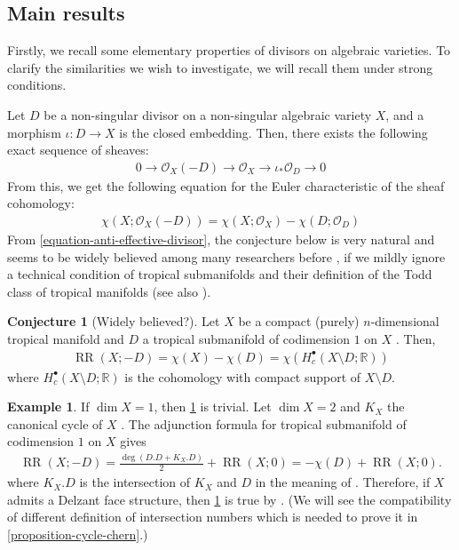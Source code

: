 \documentclass[a4paper,dvipdfmx,reqno,12pt]{amsart}
\theoremstyle{definition}
\newtheorem{example}[theorem]{Example}
\newtheorem{conjecture}[theorem]{Conjecture}
\newcommand{\opn}[1]{\operatorname{#1}}
\numberwithin{equation}{section}
\begin{document}
\subsection{Main results}

Firstly, we recall some elementary properties
of divisors on algebraic varieties. 
To clarify the similarities we wish to investigate,
we will recall them under strong conditions.

Let $D$ be a non-singular divisor on a non-singular
algebraic variety $X$, and a morphism  
$\iota\colon D\to X$ is the closed embedding.
Then, there exists the following exact sequence
of sheaves:
\begin{align}
     0\to \mathcal{O}_X(-D)\to 
\mathcal{O}_X\to \iota_*\mathcal{O}_D\to 0
\end{align}
From this, we get the following equation for the Euler
characteristic of the sheaf cohomology:
\begin{align}
\label{equation-anti-effective-divisor}
\chi(X;\mathcal{O}_X(-D))=\chi(X;\mathcal{O}_X)
-\chi(D;\mathcal{O}_D)
\end{align}
From \eqref{equation-anti-effective-divisor},
the conjecture below is very natural and 
seems to be widely
believed among many researchers
before \cite{demedrano2023chern}, if
we mildly ignore a technical condition of 
tropical submanifolds \cite[Definition 2.14]{demedrano2023chern}
and their definition of the Todd class of
tropical manifolds
(see also
\cite[Definition 4.3]{shaw2015tropical}).

\begin{conjecture}[{Widely believed?}]
\label{conjecture-rr-c-euler}
Let $X$ be a compact
(purely) $n$-dimensional tropical manifold and
$D$ a tropical submanifold of codimension $1$
on $X$ 
\cite[Definition 2.14]{demedrano2023chern}.
Then,
\begin{align}
\opn{RR}(X;-D)=
\chi (X)-\chi(D)=
\chi (H^{\bullet}_c(X\setminus D;\mathbb{R}))
\end{align}
where $H_c^{\bullet}(X\setminus D;\mathbb{R})$ 
is the cohomology with compact support of $X\setminus D$.
\end{conjecture}

\begin{example}
If $\dim X=1$, then 
\cref{conjecture-rr-c-euler} is trivial.
Let $\dim X=2$ and $K_X$ the canonical cycle of
$X$ \cite[Definition 5.8]{MR2275625}.
The adjunction formula for tropical submanifold
of codimension $1$ on $X$
\cite[Theorem 6]{shaw2015tropical} gives
\begin{align}
\opn{RR}(X;-D)=\frac{\opn{deg}(D.D+K_X.D)}{2}+\opn{RR}(X;0)
=-\chi(D)+\opn{RR}(X;0).
\end{align}
where $K_X.D$ is the intersection of 
$K_X$ and $D$ in the meaning of \cite{shaw2015tropical}.
Therefore, if $X$ admits a Delzant face structure,
then \cref{conjecture-rr-c-euler} is true
by \cite[Theorem 6.3]{demedrano2023chern}.
(We will see the compatibility of different definition of
intersection numbers which is needed to prove it in
\cref{proposition-cycle-chern}.)
\end{example}
\end{document}
